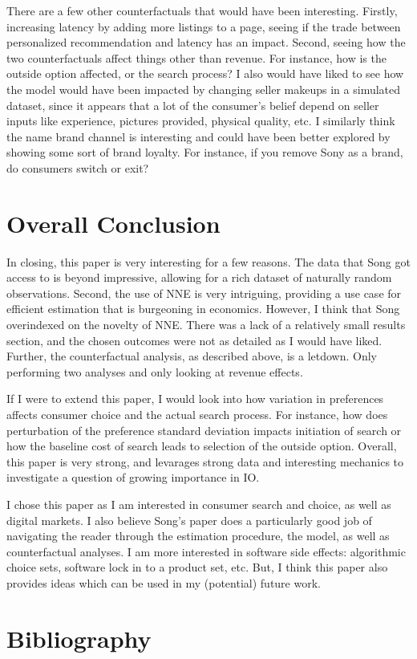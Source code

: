 \documentclass[11pt]{article}
\theoremstyle{definition}
\theoremstyle{remark}
\begin{document}
There are a few other counterfactuals that would have been interesting. Firstly, increasing latency by adding more listings to a page, seeing if the trade between personalized recommendation
and latency has an impact. Second, seeing how the two counterfactuals affect things other than revenue. For instance, how is the outside option affected, or the search process? I also would have
liked to see how the model would have been impacted by changing seller makeups in a simulated dataset, since it appears that a lot of the consumer's belief depend on seller inputs like experience,
pictures provided, physical quality, etc. I similarly think the name brand channel is interesting and could have been better explored by showing some sort of brand loyalty. For instance, if you 
remove Sony as a brand, do consumers switch or exit?


\section{Overall Conclusion}

In closing, this paper is very interesting for a few reasons. The data that Song got access to is beyond impressive, allowing for a rich dataset of naturally random observations. Second, the
use of NNE is very intriguing, providing a use case for efficient estimation that is burgeoning in economics. However, I think that Song overindexed on the novelty of NNE. There was a lack of 
a relatively small results section, and the chosen outcomes were not as detailed as I would have liked. Further, the counterfactual analysis, as described above, is a letdown. Only performing 
two analyses and only looking at revenue effects. 

If I were to extend this paper, I would look into how variation in preferences affects consumer choice and the actual search process. For instance, how does perturbation of the preference standard
deviation impacts initiation of search or how the baseline cost of search leads to selection of the outside option. Overall, this paper is very strong, and levarages strong data and interesting
mechanics to investigate a question of growing importance in IO.

I chose this paper as I am interested in consumer search and choice, as well as digital markets. I also believe Song's paper does a particularly good job of navigating the reader through the estimation
procedure, the model, as well as counterfactual analyses. I am more interested in software side effects: algorithmic choice sets, software lock in to a product set, etc. But, I think this paper also
provides ideas which can be used in my (potential) future work.

\section{Bibliography}



\end{document}
